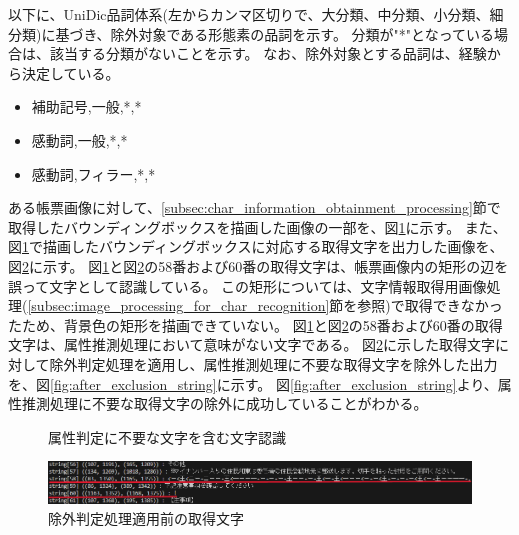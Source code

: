 以下に、UniDic品詞体系(左からカンマ区切りで、大分類、中分類、小分類、細分類)に基づき、除外対象である形態素の品詞を示す。
分類が"*"となっている場合は、該当する分類がないことを示す。
なお、除外対象とする品詞は、経験から決定している。

\begin{itemize}
    \item 補助記号,一般,*,*
    \item 感動詞,一般,*,*
    \item 感動詞,フィラー,*,*
\end{itemize}

ある帳票画像に対して、\ref{subsec:char_information_obtainment_processing}節で取得したバウンディングボックスを描画した画像の一部を、図\ref{fig:before_exclusion_bbox}に示す。
また、図\ref{fig:before_exclusion_bbox}で描画したバウンディングボックスに対応する取得文字を出力した画像を、図\ref{fig:before_exclusion_string}に示す。
図\ref{fig:before_exclusion_bbox}と図\ref{fig:before_exclusion_string}の58番および60番の取得文字は、帳票画像内の矩形の辺を誤って文字として認識している。
この矩形については、文字情報取得用画像処理(\ref{subsec:image_processing_for_char_recognition}節を参照)で取得できなかったため、背景色の矩形を描画できていない。
図\ref{fig:before_exclusion_bbox}と図\ref{fig:before_exclusion_string}の58番および60番の取得文字は、属性推測処理において意味がない文字である。
図\ref{fig:before_exclusion_string}に示した取得文字に対して除外判定処理を適用し、属性推測処理に不要な取得文字を除外した出力を、図\ref{fig:after_exclusion_string}に示す。
図\ref{fig:after_exclusion_string}より、属性推測処理に不要な取得文字の除外に成功していることがわかる。

\begin{figure}[t]
    \begin{center}
        \caption{属性判定に不要な文字を含む文字認識}
        \label{fig:before_exclusion_bbox}
    \end{center}
\end{figure}

\begin{figure}[t]
    \begin{center}
        \includegraphics[width=15cm]{image/04-implementation/before_exclusion_string.png}
        \caption{除外判定処理適用前の取得文字}
        \label{fig:before_exclusion_string}
    \end{center}
\end{figure}

